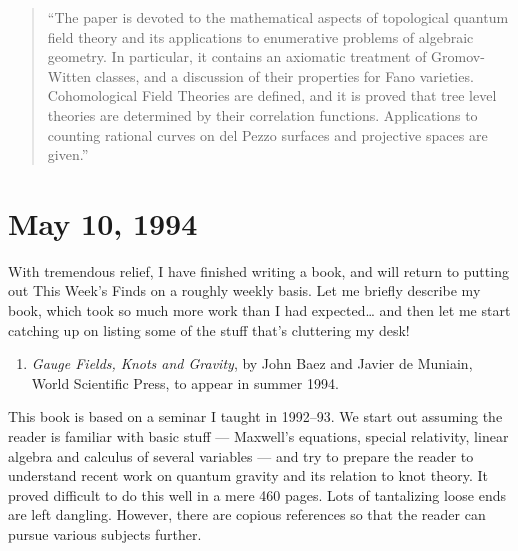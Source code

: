 \documentclass{article}
\def\tightlist{}
\begin{document}
\begin{quote}
``The paper is devoted to the mathematical aspects of topological
quantum field theory and its applications to enumerative problems of
algebraic geometry. In particular, it contains an axiomatic treatment of
Gromov-Witten classes, and a discussion of their properties for Fano
varieties. Cohomological Field Theories are defined, and it is proved
that tree level theories are determined by their correlation functions.
Applications to counting rational curves on del Pezzo surfaces and
projective spaces are given.''
\end{quote}
\hypertarget{week33}{%
\section{May 10, 1994}\label{week33}}

With tremendous relief, I have finished writing a book, and will return
to putting out This Week's Finds on a roughly weekly basis. Let me
briefly describe my book, which took so much more work than I had
expected\ldots{} and then let me start catching up on listing some of
the stuff that's cluttering my desk!

\begin{enumerate}
\def\labelenumi{\arabic{enumi})}
\tightlist
\item
  \emph{Gauge Fields, Knots and Gravity}, by John Baez and Javier de
  Muniain, World Scientific Press, to appear in summer 1994.
\end{enumerate}

This book is based on a seminar I taught in 1992--93. We start out
assuming the reader is familiar with basic stuff --- Maxwell's
equations, special relativity, linear algebra and calculus of several
variables --- and try to prepare the reader to understand recent work on
quantum gravity and its relation to knot theory. It proved difficult to
do this well in a mere 460 pages. Lots of tantalizing loose ends are
left dangling. However, there are copious references so that the reader
can pursue various subjects further.
\end{document}
